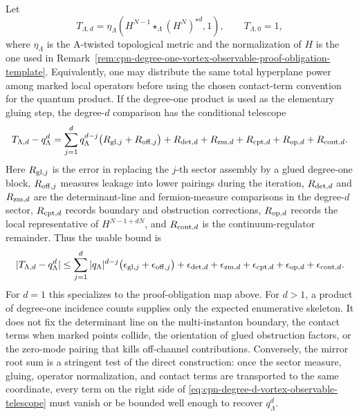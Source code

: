 \begin{remark}
Let
\[
  T_{\Lambda,d}
  =
  \eta_\Lambda\!\left(
    H^{N-1}\star_\Lambda (H^N)^{\star d},1
  \right),
  \qquad T_{\Lambda,0}=1,
\]
where \(\eta_\Lambda\) is the A-twisted topological metric and the
normalization of \(H\) is the one used in
Remark~\ref{rem:cpn-degree-one-vortex-observable-proof-obligation-template}.
Equivalently, one may distribute the same total hyperplane power among marked
local operators before using the chosen contact-term convention for the
quantum product.  If the degree-one product is used as the elementary gluing
step, the degree-\(d\) comparison has the conditional telescope
\begin{equation}
  T_{\Lambda,d}-q_\Lambda^d
  =
  \sum_{j=1}^{d} q_\Lambda^{d-j}
    \big(R_{{\rm gl},j}+R_{{\rm off},j}\big)
  +R_{{\rm det},d}
  +R_{{\rm zm},d}
  +R_{{\rm cpt},d}
  +R_{{\rm op},d}
  +R_{{\rm cont},d}.
  \label{eq:cpn-degree-d-vortex-observable-telescope}
\end{equation}
Here \(R_{{\rm gl},j}\) is the error in replacing the \(j\)-th sector
assembly by a glued degree-one block, \(R_{{\rm off},j}\) measures leakage
into lower pairings during the iteration, \(R_{{\rm det},d}\) and
\(R_{{\rm zm},d}\) are the determinant-line and fermion-measure comparisons
in the degree-\(d\) sector, \(R_{{\rm cpt},d}\) records boundary and
obstruction corrections, \(R_{{\rm op},d}\) records the local representative
of \(H^{N-1+dN}\), and \(R_{{\rm cont},d}\) is the continuum-regulator
remainder.  Thus the usable bound is
\begin{equation}
  |T_{\Lambda,d}-q_\Lambda^d|
  \le
  \sum_{j=1}^{d}|q_\Lambda|^{d-j}
    \big(\epsilon_{{\rm gl},j}+\epsilon_{{\rm off},j}\big)
  +\epsilon_{{\rm det},d}
  +\epsilon_{{\rm zm},d}
  +\epsilon_{{\rm cpt},d}
  +\epsilon_{{\rm op},d}
  +\epsilon_{{\rm cont},d}.
  \label{eq:cpn-degree-d-vortex-observable-bound}
\end{equation}
For \(d=1\) this specializes to the proof-obligation map above.  For
\(d>1\), a product of degree-one incidence counts supplies only the expected
enumerative skeleton.  It does not fix the determinant line on the
multi-instanton boundary, the contact terms when marked points collide, the
orientation of glued obstruction factors, or the zero-mode pairing that kills
off-channel contributions.  Conversely, the mirror root sum is a stringent
test of the direct construction: once the sector measure, gluing, operator
normalization, and contact terms are transported to the same coordinate, every
term on the right side of
\eqref{eq:cpn-degree-d-vortex-observable-telescope} must vanish or be bounded
well enough to recover \(q_\Lambda^d\).
\end{remark}


